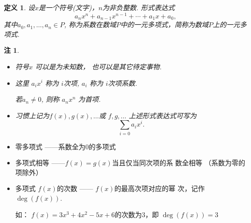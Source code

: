 \documentclass[13pt,fontset=mac]{ctexbeamer}
\newtheorem*{defi}{定义}
\newtheorem*{rem}{注}
\begin{document}
\begin{frame}

\begin{defi}
设$x$是一个符号(文字)，$n$为非负整数. 
形式表达式  
\[
a_nx^n+a_{n-1}x^{n-1}+\cdots+a_1x+a_0,
\]                
其中$a_0, a_1, \ldots, a_n\in P$, 称为系数在数域$P$中的一元多项式，简称为\alert{数域$P$上的一元多项式}.
\end{defi}


\begin{rem}
\begin{itemize}
\item 符号$x$ 可以是为未知数，
也可以是其它待定事物.
\item 这里 $a_ix^i$ 称为 \alert{$i$次项}, $a_i$ 称为 \alert{$i$次项系数}.

若$a_n\neq 0$, 则称 $a_n x^n$ 为\alert{首项}.
\item 习惯上记为$f (x), g(x), \ldots$或 $f, g, \ldots$ 
上述形式表达式可写为         
\[
\sum_{i=0}a_i x^i.
\]       
\end{itemize}
\end{rem}
\end{frame}

\begin{frame}
\begin{itemize}
\item 零多项式  ——系数全为0的多项式
\item 多项式相等 ——$ f (x)=g(x)$当且仅当同次项的系
数全相等 （系数为零的项除外）
\item 多项式 $f (x)$的次数 —— $f (x)$的最高次项对应的幂
次，记作 $\deg (f (x))$.

如： $f (x) =3x^3+4x^2-5x+6$的次数为3，即
$\deg (f (x))=3$

\end{itemize}

\end{frame}
\end{document}
